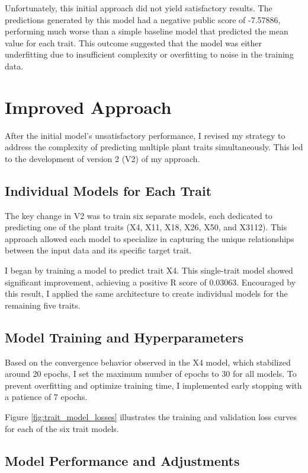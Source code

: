 \documentclass{article}
\begin{document}
Unfortunately, this initial approach did not yield satisfactory results. The predictions generated by this model had a negative public score of -7.57886, performing much worse than a simple baseline model that predicted the mean value for each trait. This outcome suggested that the model was either underfitting due to insufficient complexity or overfitting to noise in the training data. 

\section{Improved Approach}

After the initial model's unsatisfactory performance, I revised my strategy to address the complexity of predicting multiple plant traits simultaneously. This led to the development of version 2 (V2) of my approach.

\subsection{Individual Models for Each Trait}

The key change in V2 was to train six separate models, each dedicated to predicting one of the plant traits (X4, X11, X18, X26, X50, and X3112). This approach allowed each model to specialize in capturing the unique relationships between the input data and its specific target trait.

I began by training a model to predict trait X4. This single-trait model showed significant improvement, achieving a positive R score of 0.03063. Encouraged by this result, I applied the same architecture to create individual models for the remaining five traits.

\subsection{Model Training and Hyperparameters}

Based on the convergence behavior observed in the X4 model, which stabilized around 20 epochs, I set the maximum number of epochs to 30 for all models. To prevent overfitting and optimize training time, I implemented early stopping with a patience of 7 epochs.

Figure \ref{fig:trait_model_losses} illustrates the training and validation loss curves for each of the six trait models.

\subsection{Model Performance and Adjustments}
\end{document}
